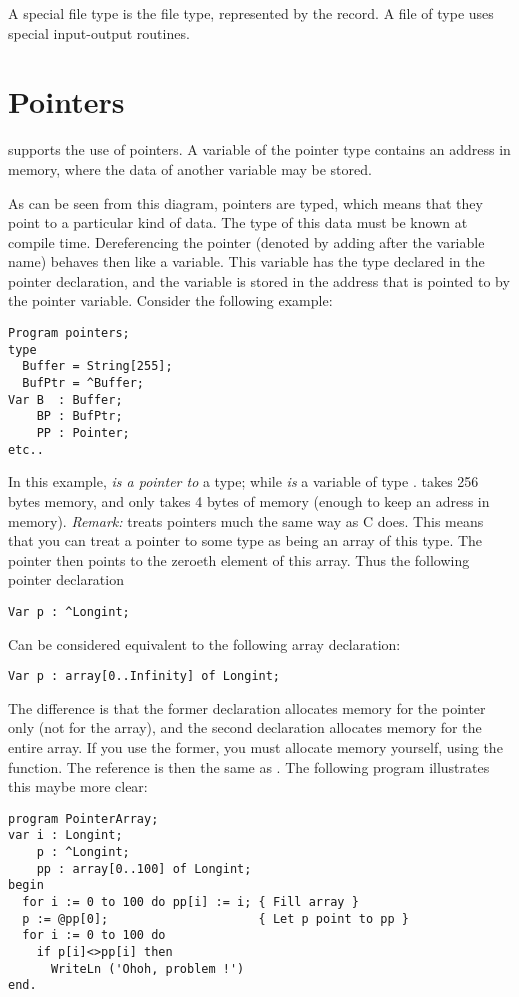 \documentclass{report}
\begin{document}
A special file type is the  file type, represented by the
 record. A file of type  uses special input-output
routines.

\section{Pointers}
\fpc supports the use of pointers. A variable of the pointer type
contains an address in memory, where the data of another variable may be
stored.

As can be seen from this diagram, pointers are typed, which means that
they point to a particular kind of data. The type of this data must be
known at compile time.
Dereferencing the pointer (denoted by adding \var{\^{}} after the variable
name) behaves then like a variable. This variable has the type declared in
the pointer declaration, and the variable is stored in the address that is
pointed to by the pointer variable.
Consider the following example:
\begin{verbatim}
Program pointers;
type
  Buffer = String[255];
  BufPtr = ^Buffer;
Var B  : Buffer;
    BP : BufPtr;
    PP : Pointer;
etc..
\end{verbatim}
In this example,  {\em is a pointer to} a  type; while 
{\em is} a variable of type .  takes 256 bytes memory,
and  only takes 4 bytes of memory (enough to keep an adress in
memory).
{\em Remark:} \fpc treats pointers much the same way as C does. This means
that you can treat a pointer to some type as being an array of this type.
The pointer then points to the zeroeth element of this array. Thus the
following pointer declaration
\begin{verbatim}
Var p : ^Longint;
\end{verbatim}
Can be considered equivalent to the following array declaration:
\begin{verbatim}
Var p : array[0..Infinity] of Longint;
\end{verbatim}
The difference is that the former declaration allocates memory for the
pointer only (not for the array), and the second declaration allocates
memory for the entire array. If you use the former, you must allocate memory
yourself, using the  function.
The reference  is then the same as . The following program
illustrates this maybe more clear:
\begin{verbatim}
program PointerArray;
var i : Longint;
    p : ^Longint;
    pp : array[0..100] of Longint;
begin
  for i := 0 to 100 do pp[i] := i; { Fill array }
  p := @pp[0];                     { Let p point to pp }
  for i := 0 to 100 do
    if p[i]<>pp[i] then
      WriteLn ('Ohoh, problem !')
end.
\end{verbatim}
\end{document}
